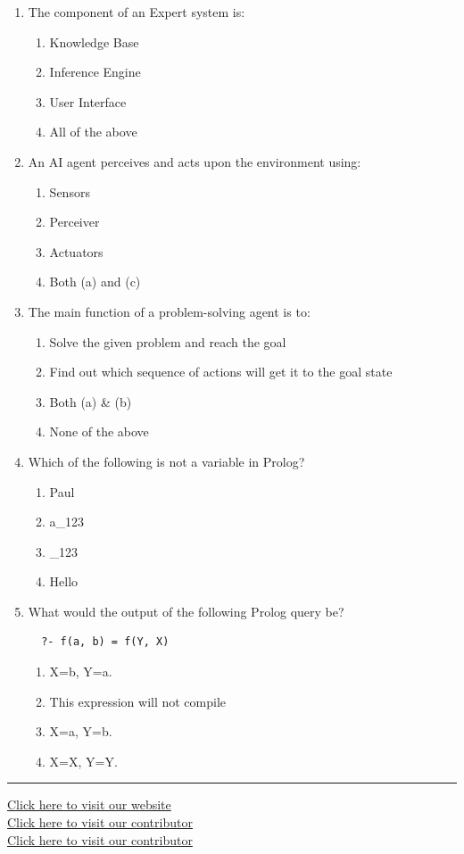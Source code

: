 \documentclass[11pt,a4paper]{article}
\begin{document}
\begin{enumerate}[label=(\roman*),leftmargin=*,itemsep=12pt]
  \item The component of an Expert system is:
  \begin{enumerate}[label=(\alph*),itemsep=2pt]
    \item Knowledge Base
    \item Inference Engine
    \item User Interface
    \item All of the above
  \end{enumerate}
  
  \item An AI agent perceives and acts upon the environment using:
  \begin{enumerate}[label=(\alph*),itemsep=2pt]
    \item Sensors
    \item Perceiver
    \item Actuators
    \item Both (a) and (c)
  \end{enumerate}
  
  \item The main function of a problem-solving agent is to:
  \begin{enumerate}[label=(\alph*),itemsep=2pt]
    \item Solve the given problem and reach the goal
    \item Find out which sequence of actions will get it to the goal state
    \item Both (a) \& (b)
    \item None of the above
  \end{enumerate}
  
  \item Which of the following is not a variable in Prolog?
  \begin{enumerate}[label=(\alph*),itemsep=2pt]
    \item Paul
    \item a\_123
    \item \_123
    \item Hello
  \end{enumerate}
  
  \item What would the output of the following Prolog query be?
  \begin{verbatim}
  ?- f(a, b) = f(Y, X)
  \end{verbatim}
  \begin{enumerate}[label=(\alph*),itemsep=2pt]
    \item X=b, Y=a.
    \item This expression will not compile
    \item X=a, Y=b.
    \item X=X, Y=Y.
  \end{enumerate}
\end{enumerate}

\vfill
\rule{\linewidth}{0.4pt}
\begin{center}\small
\href{https://bhu-exam.vercel.app/}{Click here to visit our website}\\[4pt]\href{https://me-aryan.vercel.app/}{Click here to visit our contributor}\\[4pt]\href{https://quashan-me.vercel.app/}{Click here to visit our contributor}
\end{center}
\end{document}
